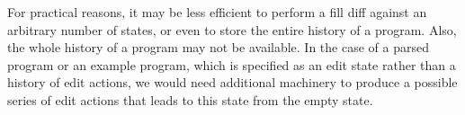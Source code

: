 For practical reasons, it may be less efficient to perform a fill diff against an arbitrary number of states, or even to store the entire history of a program. Also, the whole history of a program may not be available. In the case of a parsed program or an example program, which is specified as an edit state rather than a history of edit actions, we would need additional machinery to produce a possible series of edit actions that leads to this state from the empty state.


